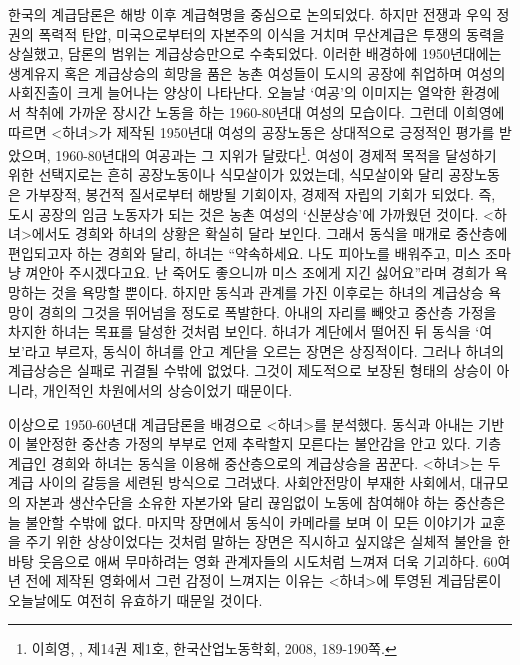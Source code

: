 한국의 계급담론은 해방 이후 계급혁명을 중심으로 논의되었다. 하지만 전쟁과 우익 정권의 폭력적 탄압, 미국으로부터의 자본주의 이식을 거치며 무산계급은 투쟁의 동력을 상실했고, 담론의 범위는 계급상승만으로 수축되었다. 이러한 배경하에 1950년대에는 생계유지 혹은 계급상승의 희망을 품은 농촌 여성들이 도시의 공장에 취업하며 여성의 사회진출이 크게 늘어나는 양상이 나타난다. 오늘날 `여공'의 이미지는 열악한 환경에서 착취에 가까운 장시간 노동을 하는 1960-80년대 여성의 모습이다. 그런데 이희영에 따르면 <하녀>가 제작된 1950년대 여성의 공장노동은 상대적으로 긍정적인 평가를 받았으며, 1960-80년대의 여공과는 그 지위가 달랐다\footnote{이희영, ,  제14권 제1호, 한국산업노동학회, 2008, 189-190쪽.}. 여성이 경제적 목적을 달성하기 위한 선택지로는 흔히 공장노동이나 식모살이가 있었는데, 식모살이와 달리 공장노동은 가부장적, 봉건적 질서로부터 해방될 기회이자, 경제적 자립의 기회가 되었다. 즉, 도시 공장의 임금 노동자가 되는 것은 농촌 여성의 `신분상승'에 가까웠던 것이다. <하녀>에서도 경희와 하녀의 상황은 확실히 달라 보인다. 그래서 동식을 매개로 중산층에 편입되고자 하는 경희와 달리, 하녀는 ``약속하세요. 나도 피아노를 배워주고, 미스 조마냥 껴안아 주시겠다고요. 난 죽어도 좋으니까 미스 조에게 지긴 싫어요''라며 경희가 욕망하는 것을 욕망할 뿐이다. 하지만 동식과 관계를 가진 이후로는 하녀의 계급상승 욕망이 경희의 그것을 뛰어넘을 정도로 폭발한다. 아내의 자리를 빼앗고 중산층 가정을 차지한 하녀는 목표를 달성한 것처럼 보인다. 하녀가 계단에서 떨어진 뒤 동식을 `여보'라고 부르자, 동식이 하녀를 안고 계단을 오르는 장면은 상징적이다. 그러나 하녀의 계급상승은 실패로 귀결될 수밖에 없었다. 그것이 제도적으로 보장된 형태의 상승이 아니라, 개인적인 차원에서의 상승이었기 때문이다.

이상으로 1950-60년대 계급담론을 배경으로 <하녀>를 분석했다. 동식과 아내는 기반이 불안정한 중산층 가정의 부부로 언제 추락할지 모른다는 불안감을 안고 있다. 기층계급인 경희와 하녀는 동식을 이용해 중산층으로의 계급상승을 꿈꾼다. <하녀>는 두 계급 사이의 갈등을 세련된 방식으로 그려냈다. 사회안전망이 부재한 사회에서, 대규모의 자본과 생산수단을 소유한 자본가와 달리 끊임없이 노동에 참여해야 하는 중산층은 늘 불안할 수밖에 없다. 마지막 장면에서 동식이 카메라를 보며 이 모든 이야기가 교훈을 주기 위한 상상이었다는 것처럼 말하는 장면은 직시하고 싶지않은 실체적 불안을 한바탕 웃음으로 애써 무마하려는 영화 관계자들의 시도처럼 느껴져 더욱 기괴하다. 60여년 전에 제작된 영화에서 그런 감정이 느껴지는 이유는 <하녀>에 투영된 계급담론이 오늘날에도 여전히 유효하기 때문일 것이다.

